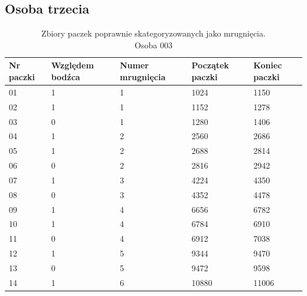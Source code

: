 \documentclass{article}
\begin{document}
        \subsection*{Osoba trzecia}
            \begin{table}[H]
                \captionsetup{justification=centering}
                \caption {Zbiory paczek poprawnie skategoryzowanych jako mrugnięcia. \\ Osoba 003}
                \begin{center}
                    \begin{tabular}{| p{1cm} | p{1.75cm} | p{1.75cm} | p{1.75cm} | p{1.75cm} |}
                        \hline
                        Nr paczki & Względem bodźca & Numer mrugnięcia & Początek paczki & Koniec paczki \\
                        \hline
                        \hline
                        01 & 1 & 1 & 1024 & 1150 \\
                        \hline
                        02 & 1 & 1 & 1152 & 1278 \\
                        \hline
                        03 & 0 & 1 & 1280 & 1406 \\
                        \hline
                        04 & 1 & 2 & 2560 & 2686 \\
                        \hline
                        05 & 1 & 2 & 2688 & 2814 \\
                        \hline
                        06 & 0 & 2 & 2816 & 2942 \\
                        \hline
                        07 & 1 & 3 & 4224 & 4350 \\
                        \hline
                        08 & 0 & 3 & 4352 & 4478 \\
                        \hline
                        09 & 1 & 4 & 6656 & 6782 \\
                        \hline
                        10 & 1 & 4 & 6784 & 6910 \\
                        \hline
                        11 & 0 & 4 & 6912 & 7038 \\
                        \hline
                        12 & 1 & 5 & 9344 & 9470 \\
                        \hline
                        13 & 0 & 5 & 9472 & 9598 \\
                        \hline
                        14 & 1 & 6 & 10880 & 11006 \\

\end{tabular}
\end{center}
\end{table}
\end{document}
